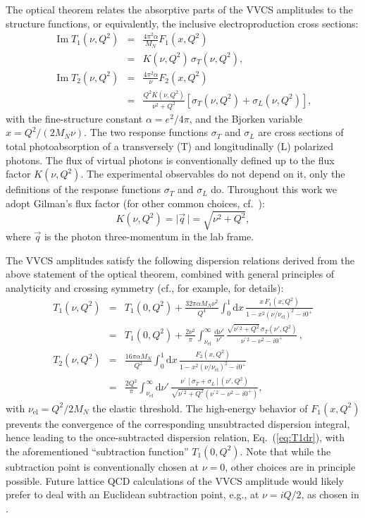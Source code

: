 \documentclass[12pt,preprint,tightenlines,
showpacs,preprintnumbers,amsmath,amssymb,
a4paper,nofootinbib]{revtex4-1}
\def\beq{\begin{equation}}
\def\eeq{\end{equation}}
\def\bea{\begin{eqnarray}}
\def\eea{\end{eqnarray}}
\def\eqlab#1{\label{eq:#1}}
\def\Eqref#1{Eq.~(\ref{eq:#1})}
\def\al{\alpha}
\def\si{\sigma} \def\Si{{\it\Sigma}}
\def\nn{\nonumber}
\def\dd{\mathrm{d}}
\DeclareMathOperator\im{Im}
\begin{document}
The optical theorem relates the absorptive parts of the VVCS amplitudes to the structure functions, or equivalently, the inclusive electroproduction cross sections:
\begin{subequations}
\eqlab{VVCSunitarity}
\bea
\im T_1(\nu,Q^2)&=&\frac{4\pi^2\al}{M_N}F_1(x,Q^2) \nn\\ \eqlab{ImT1} &=& K(\nu,Q^2)\,\sigma_T(\nu,Q^2), \\
\im T_2(\nu,Q^2)&=&\frac{4\pi^2\al}{\nu}F_2(x,Q^2)\nn\\
\eqlab{ImT2} &=& \frac{Q^2  K(\nu,Q^2) }{\nu^2+Q^2}\left[\sigma_T(\nu,Q^2)+\sigma_L(\nu,Q^2)\right],
\eea
\end{subequations}
with the fine-structure constant $\alpha=e^2/4\pi$, and the Bjorken variable $x=Q^2/(2M_N \nu)$. The two response functions $\sigma_T$ and $\sigma_L$ are cross sections of total photoabsorption  of a transversely (T) and longitudinally (L) polarized photons.
The flux of virtual photons is
conventionally defined up to the flux factor $K(\nu,Q^2)$. The experimental observables do not depend on it, only the definitions of the response functions $\sigma_T$ and $\sigma_L$ do.  
Throughout this work we adopt  Gilman's flux factor 
(for other common choices, cf.~\cite{Drechsel:2002ar}):
\beq 
K(\nu,Q^2)=\vert\vec{q}\,\vert=\sqrt{\nu^2+Q^2},
\eeq
where  $\vec{q}$ is the photon three-momentum in the lab frame.

The VVCS amplitudes satisfy the following dispersion relations derived from the above statement of the  optical theorem, combined with general principles of analyticity and crossing symmetry
(cf., for example, \cite{Drechsel:2002ar,Hagelstein:2015egb,Pascalutsa:2018ced} for  details):
\begin{subequations}
\eqlab{genDRs}
\bea 
T_1 ( \nu, Q^2) &=&T_1(0,Q^2) + \frac{32\pi\al M_N\nu^2}{Q^4} \int_{0}^1 
\!\dd x \,
\frac{x\, F_1 (x, Q^2)}{1 - x^2 (\nu/\nu_{\mathrm{el}})^2 - i 0^+} \nonumber\\ 
&=& T_1(0,Q^2) + \frac{2\nu^2}{\pi } \int_{\nu_{\mathrm{el}}}^\infty\! \frac{\dd \nu'}{\nu'} \, 
\frac{\sqrt{\nu^{\prime\,2}+Q^2}\,\si_T ( \nu', Q^2)}{\nu^{\prime\,2} -\nu^2 - i 0^+}\,,\eqlab{T1dr}\\
T_2 ( \nu, Q^2) &=& \frac{16\pi\al M_N}{Q^2} \int_{0}^1 
\!\dd x\, 
\frac{F_2 (x, Q^2)}{1 - x^2 (\nu/\nu_{\mathrm{el}})^2  - i 0^+} \nonumber \\
&=&\frac{2Q^2}{\pi} \int_{\nu_{\mathrm{el}}}^\infty\! \dd \nu' \, 
\frac{\nu^{\prime}\,[ \si_T+\si_L] ( \nu', Q^2)}{\sqrt{\nu^{\prime\,2}+Q^2}(\nu^{\prime\,2} -\nu^2- i 0^+)} \eqlab{T2dr},
\eea 
\end{subequations}
with $\nu_{\mathrm{el}}=Q^2/2M_N$ the elastic threshold. The high-energy behavior of $F_1(x,Q^2)$ prevents the convergence of the corresponding unsubtracted dispersion integral,  hence
leading to the once-subtracted dispersion relation, \Eqref{T1dr}, with the aforementioned ``subtraction function'' $T_1(0,Q^2)$. 
Note that while the subtraction point is conventionally
chosen at $\nu = 0$, 
other choices are in principle possible. Future lattice QCD calculations of the VVCS amplitude would likely  prefer to deal
with an Euclidean subtraction point,  e.g., at $\nu =iQ/2$, as chosen in \cite{Gasser:2020mzy}. 
\end{document}
